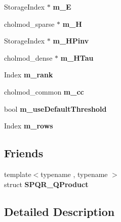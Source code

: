 \begin{DoxyCompactItemize}
Storage\+Index $\ast$ {\bfseries m\+\_\+E}
\item 
\mbox{\label{class_eigen_1_1_s_p_q_r_a140c5b6f6b7f1fec2a3036416f9f912c}} 
cholmod\+\_\+sparse $\ast$ {\bfseries m\+\_\+H}
\item 
\mbox{\label{class_eigen_1_1_s_p_q_r_a195c4480d9a0777340fed72818f2b501}} 
Storage\+Index $\ast$ {\bfseries m\+\_\+\+H\+Pinv}
\item 
\mbox{\label{class_eigen_1_1_s_p_q_r_a596a112237c151ca14880b2cb26ca6b8}} 
cholmod\+\_\+dense $\ast$ {\bfseries m\+\_\+\+H\+Tau}
\item 
\mbox{\label{class_eigen_1_1_s_p_q_r_a409e15f8004d93f7894583f73eada675}} 
Index {\bfseries m\+\_\+rank}
\item 
\mbox{\label{class_eigen_1_1_s_p_q_r_a29ab6683b538ca30772205ac0333e25f}} 
cholmod\+\_\+common {\bfseries m\+\_\+cc}
\item 
\mbox{\label{class_eigen_1_1_s_p_q_r_a4f6a5ff105e5a93593a62a6563d17682}} 
bool {\bfseries m\+\_\+use\+Default\+Threshold}
\item 
\mbox{\label{class_eigen_1_1_s_p_q_r_a7f9cc5503fc6bf6062c244ae618a4b12}} 
Index {\bfseries m\+\_\+rows}
\end{DoxyCompactItemize}
\subsection*{Friends}
\begin{DoxyCompactItemize}
\item 
\mbox{\label{class_eigen_1_1_s_p_q_r_a62e1c57e79306951013fc9d5b12c30e0}} 
{\footnotesize template$<$typename , typename $>$ }\\struct {\bfseries S\+P\+Q\+R\+\_\+\+Q\+Product}
\end{DoxyCompactItemize}


\subsection{Detailed Description}
